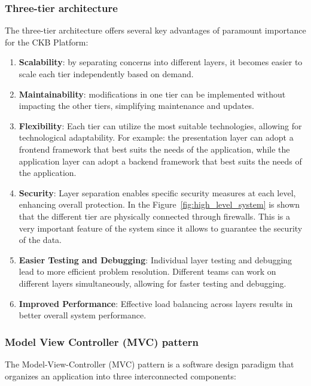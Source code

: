 \begin{itemize}
\subsubsection{Three-tier architecture}
The three-tier architecture offers several key advantages of paramount importance for the CKB Platform:
\begin{enumerate}
    \item \textbf{Scalability}: by separating concerns into different layers, it becomes easier to scale each tier independently based on demand.
    \item \textbf{Maintainability}: modifications in one tier can be implemented without impacting the other tiers, simplifying maintenance and updates.
    \item \textbf{Flexibility}: Each tier can utilize the most suitable technologies, allowing for technological adaptability. For example: the presentation layer can adopt a frontend framework that best suits the needs of the application, while the application layer can adopt a backend framework that best suits the needs of the application.
    \item \textbf{Security}: Layer separation enables specific security measures at each level, enhancing overall protection. In the Figure\ \ref{fig:high_level_system} is shown that the different tier are physically connected through firewalls. This is a very important feature of the system since it allows to guarantee the security of the data.
    \item \textbf{Easier Testing and Debugging}: Individual layer testing and debugging lead to more efficient problem resolution. Different teams can work on different layers simultaneously, allowing for faster testing and debugging.
    \item \textbf{Improved Performance}: Effective load balancing across layers results in better overall system performance.
\end{enumerate}
\subsubsection{Model View Controller (MVC) pattern}
The Model-View-Controller (MVC) pattern is a software design paradigm that organizes an application into three interconnected components:


\end{itemize}
